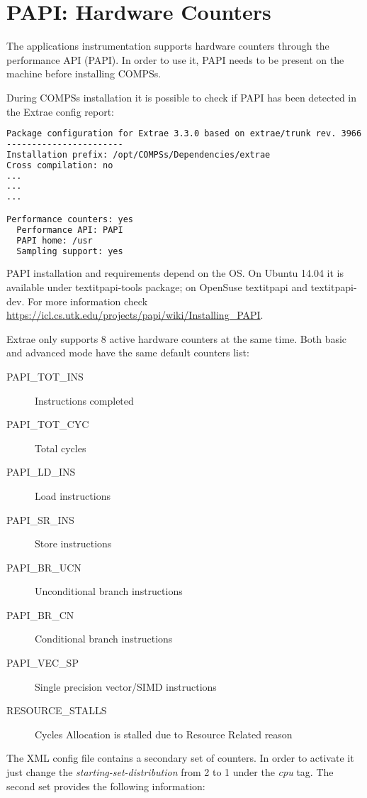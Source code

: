 \section{PAPI: Hardware Counters}
\label{sec:papi}

The applications instrumentation supports hardware counters through the performance API (PAPI). In order to use it, PAPI needs to be present on the machine before installing
COMPSs. 

During COMPSs installation it is possible to check if PAPI has been detected in the Extrae config report:

\begin{lstlisting}[language=bash]
Package configuration for Extrae 3.3.0 based on extrae/trunk rev. 3966:
-----------------------
Installation prefix: /opt/COMPSs/Dependencies/extrae
Cross compilation: no
...
...
...

Performance counters: yes
  Performance API: PAPI
  PAPI home: /usr
  Sampling support: yes
\end{lstlisting}


PAPI installation and requirements depend on the OS. On Ubuntu 14.04 it is available under textit{papi-tools} package; on OpenSuse textit{papi} and textit{papi-dev}.
For more information check \url{https://icl.cs.utk.edu/projects/papi/wiki/Installing_PAPI}.

Extrae only supports 8 active hardware counters at the same time. Both basic and advanced mode have the same default counters list:

\begin{description}
 \item [PAPI\_TOT\_INS] Instructions completed
 \item [PAPI\_TOT\_CYC] Total cycles
 \item [PAPI\_LD\_INS] Load instructions
 \item [PAPI\_SR\_INS] Store instructions
 \item [PAPI\_BR\_UCN] Unconditional branch instructions
 \item [PAPI\_BR\_CN] Conditional branch instructions
 \item [PAPI\_VEC\_SP] Single precision vector/SIMD instructions
 \item [RESOURCE\_STALLS] Cycles Allocation is stalled due to Resource Related reason
\end{description}

The XML config file contains a secondary set of counters. In order to activate it just change the \textit{starting-set-distribution} from 2 to 1 under the \textit{cpu} tag. The second set provides the following information:

